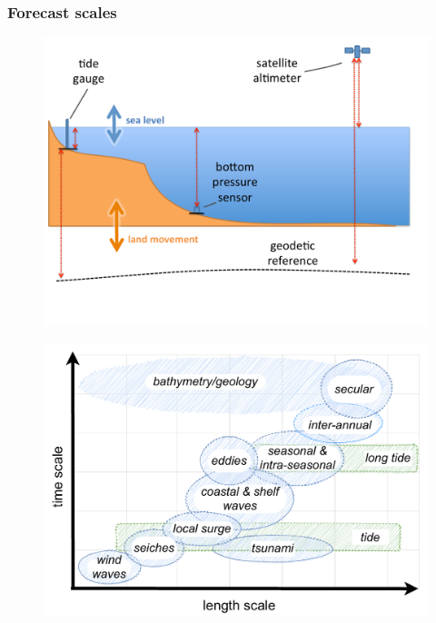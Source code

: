 \begin{frame}
\frametitle{Forecast scales}
\begin{minipage}{0.45\textwidth}
    \begin{figure}      
    \includegraphics[width=\textwidth]{figures/diagrams/sealevel_cartoon.pdf}
    \end{figure}
\end{minipage}
\hfill
\begin{minipage}{0.45\textwidth}
    \begin{figure}      
     \includegraphics[width=\textwidth]{figures/diagrams/scales_time_length.pdf}
    \end{figure} 
\end{minipage}
\end{frame}